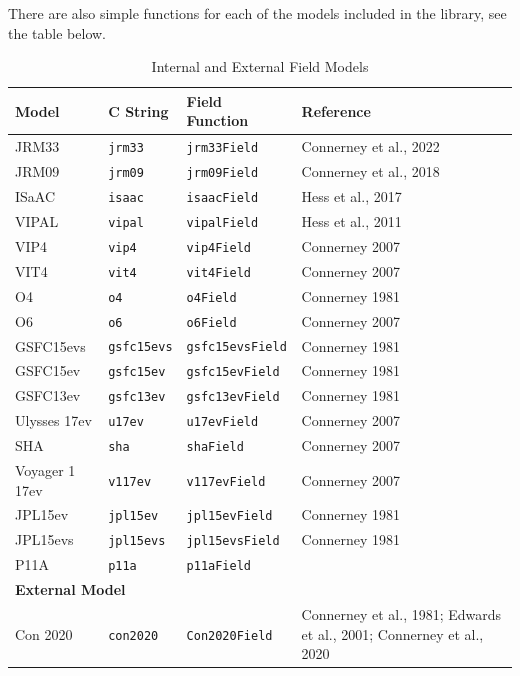 		There are also simple functions for each of the models included in the library, see the table below.
	
		\begin{table}[h]
			\centering
			\begin{tabular}{|l|l|l|l|}
				\hline
				Model & C String & Field Function & Reference \\
				\hline
				JRM33 & \texttt{jrm33} & \texttt{jrm33Field} & Connerney et al., 2022 \\
				JRM09 & \texttt{jrm09} & \texttt{jrm09Field} & Connerney et al., 2018 \\
				ISaAC & \texttt{isaac} & \texttt{isaacField} & Hess et al., 2017 \\
				VIPAL & \texttt{vipal} & \texttt{vipalField} & Hess et al., 2011 \\
				VIP4 & \texttt{vip4} & \texttt{vip4Field} & Connerney 2007 \\
				VIT4 & \texttt{vit4} & \texttt{vit4Field} & Connerney 2007 \\
				O4 & \texttt{o4} & \texttt{o4Field} & Connerney 1981 \\
				O6 & \texttt{o6} & \texttt{o6Field} & Connerney 2007 \\
				GSFC15evs & \texttt{gsfc15evs} & \texttt{gsfc15evsField} & Connerney 1981 \\
				GSFC15ev & \texttt{gsfc15ev} & \texttt{gsfc15evField} & Connerney 1981 \\
				GSFC13ev & \texttt{gsfc13ev} & \texttt{gsfc13evField} & Connerney 1981 \\
				Ulysses 17ev & \texttt{u17ev} & \texttt{u17evField} & Connerney 2007 \\
				SHA & \texttt{sha} & \texttt{shaField} & Connerney 2007 \\
				Voyager 1 17ev & \texttt{v117ev} & \texttt{v117evField} & Connerney 2007 \\
				JPL15ev & \texttt{jpl15ev} & \texttt{jpl15evField} & Connerney 1981 \\
				JPL15evs & \texttt{jpl15evs} & \texttt{jpl15evsField} & Connerney 1981 \\
				P11A & \texttt{p11a} & \texttt{p11aField} & \\
				\hline
				\multicolumn{4}{|l|}{\textbf{External Model}} \\
				\hline
				Con 2020 & \texttt{con2020} & \texttt{Con2020Field} & Connerney et al., 1981; Edwards et al., 2001; Connerney et al., 2020 \\
				\hline
			\end{tabular}
			\caption{Internal and External Field Models}
		\end{table}
		
